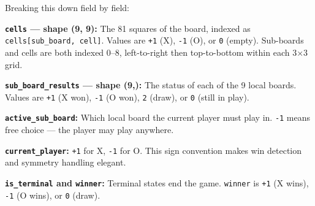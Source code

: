 \begin{Shaded}
\begin{Highlighting}[]

\OperatorTok{=}
\OperatorTok{=}\NormalTok{, }\OperatorTok{=}
\NormalTok{    )}
\OperatorTok{=}
\OperatorTok{=}\OperatorTok{=}
\NormalTok{    )}
 \OperatorTok{=} \OperatorTok{{-}}
 \OperatorTok{=} 
 \OperatorTok{=} 
 \OperatorTok{=} 
 \OperatorTok{=} 
\end{Highlighting}
\end{Shaded}

Breaking this down field by field:

\textbf{\texttt{cells} --- shape (9, 9):} The 81 squares of the board,
indexed as \texttt{cells{[}sub\_board,\ cell{]}}. Values are \texttt{+1}
(X), \texttt{-1} (O), or \texttt{0} (empty). Sub-boards and cells are
both indexed 0--8, left-to-right then top-to-bottom within each 3×3
grid.

\textbf{\texttt{sub\_board\_results} --- shape (9,):} The status of each
of the 9 local boards. Values are \texttt{+1} (X won), \texttt{-1} (O
won), \texttt{2} (draw), or \texttt{0} (still in play).

\textbf{\texttt{active\_sub\_board}:} Which local board the current
player must play in. \texttt{-1} means free choice --- the player may
play anywhere.

\textbf{\texttt{current\_player}:} \texttt{+1} for X, \texttt{-1} for O.
This sign convention makes win detection and symmetry handling elegant.

\textbf{\texttt{is\_terminal} and \texttt{winner}:} Terminal states end
the game. \texttt{winner} is \texttt{+1} (X wins), \texttt{-1} (O wins),
or \texttt{0} (draw).

